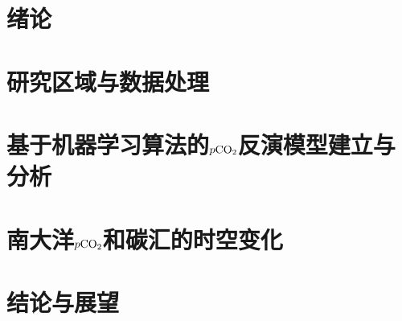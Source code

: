 \chapter{绪论}

\chapter{研究区域与数据处理}

\chapter{基于机器学习算法的\texorpdfstring{$p\rm CO_2$}{}反演模型建立与分析}

\chapter{南大洋\texorpdfstring{$p\rm CO_2$}{}和碳汇的时空变化}

\chapter{结论与展望}

